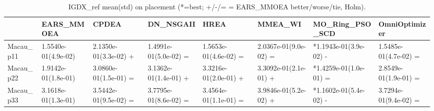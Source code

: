 \begin{table}[t]
\centering
\caption{IGDX_ref mean(std) on placement (*=best; +/-/= = EARS_MMOEA better/worse/tie, Holm).}
\label{tab:placement_IGDX_ref}
\begin{tabular}{llllllll}
\toprule
 & EARS\_MMOEA & CPDEA & DN\_NSGAII & HREA & MMEA\_WI & MO\_Ring\_PSO\_SCD & OmniOptimizer \\
\midrule
Macau\_p11 & 1.5540e-01(4.9e-02) & 2.1350e-01(3.3e-02) + & 1.4991e-01(5.0e-02) = & 1.5653e-01(4.6e-02) = & 2.0367e-01(9.0e-02) = & *1.1943e-01(3.9e-02) - & 1.5485e-01(4.7e-02) = \\
Macau\_p22 & 1.9142e-01(1.8e-01) & 3.0860e-01(1.5e-01) = & 3.1362e-01(1.4e-01) + & 3.3216e-01(2.0e-01) + & 3.3092e-01(2.1e-01) + & *1.4259e-01(1.0e-01) = & 2.8549e-01(1.9e-01) = \\
Macau\_p33 & 3.1618e-01(1.3e-01) & 3.5442e-01(9.5e-02) = & 3.7795e-01(8.6e-02) = & 3.4564e-01(1.1e-01) = & 3.9846e-01(5.2e-02) + & *1.1602e-01(5.4e-02) - & 3.7294e-01(9.4e-02) = \\
\bottomrule
\end{tabular}
\end{table}
